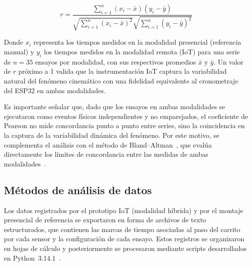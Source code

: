 \documentclass[journal,article,submit,pdftex]{Definitions/mdpi}
\begin{document}
\begin{equation}
r = \frac{\sum_{i=1}^{n} (x_i - \bar{x})(y_i - \bar{y})}{\sqrt{\sum_{i=1}^{n} (x_i - \bar{x})^2} \sqrt{\sum_{i=1}^{n} (y_i - \bar{y})^2}}
\label{eq:pearson}
\end{equation}

Donde \(x_i\) representa los tiempos medidos en la modalidad presencial (referencia manual) y \(y_i\) los tiempos medidos en la modalidad remota (IoT) para una serie de \(n=35\) ensayos por modalidad, con sus respectivos promedios \(\bar{x}\) y \(\bar{y}\). Un valor de \(r\) próximo a 1 valida que la instrumentación IoT captura la variabilidad natural del fenómeno cinemático con una fidelidad equivalente al cronometraje del ESP32 en ambas modalidades.

Es importante se\~nalar que, dado que los ensayos en ambas modalidades se ejecutaron como eventos f\'isicos independientes y no emparejados, el coeficiente de Pearson no mide concordancia punto a punto entre series, sino la coincidencia en la captura de la variabilidad din\'amica del fen\'omeno. Por este motivo, se complementa el an\'alisis con el m\'etodo de Bland--Altman~\cite{bland1986}, que eval\'ua directamente los l\'imites de concordancia entre las medidas de ambas modalidades~\cite{giavarina2015}.




\subsection{M\'etodos de an\'alisis de datos}

Los datos registrados por el prototipo IoT (modalidad h\'ibrida) y por el montaje presen\-cial de referencia se exportaron en forma de archivos de texto estructurados, que contienen las marcas de tiempo asociadas al paso del carrito por cada sensor y la configuraci\'on de cada ensayo. Estos registros se organizaron en hojas de c\'alculo y posteriormente se procesaron mediante scripts desarrollados en Python~3.14.1~\cite{r47}.
\end{document}
